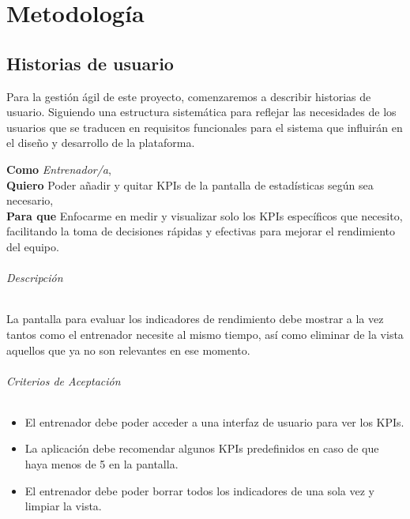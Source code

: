 
\chapter{Metodología}
\label{metodologia}

\section{Historias de usuario}
Para la gestión ágil de este proyecto, comenzaremos a describir historias de usuario. Siguiendo una estructura sistemática para reflejar las necesidades de los usuarios que se traducen en requisitos funcionales para el sistema que influirán en el diseño y desarrollo de la plataforma.

\begin{tcolorbox}[title=Historia de Usuario 1: Añadir KPIs a la pantalla de estadísticas]
\textbf{Como} \textit{Entrenador/a},\\
\textbf{Quiero} Poder añadir y quitar KPIs de la pantalla de estadísticas según sea necesario,\\
\textbf{Para que} Enfocarme en medir y visualizar solo los KPIs específicos que necesito, facilitando la toma de decisiones rápidas y efectivas para mejorar el rendimiento del equipo.
\end{tcolorbox}

\subparagraph{Descripción}
La pantalla para evaluar los indicadores de rendimiento debe mostrar a la vez tantos como el entrenador necesite al mismo tiempo, así como eliminar de la vista aquellos que ya no son relevantes en ese momento.

\subparagraph{Criterios de Aceptación}
\begin{itemize}
    \item El entrenador debe poder acceder a una interfaz de usuario para ver los KPIs.
    \item La aplicación debe recomendar algunos KPIs predefinidos en caso de que haya menos de 5 en la pantalla.
    \item El entrenador debe poder borrar todos los indicadores de una sola vez y limpiar la vista.
\end{itemize}

